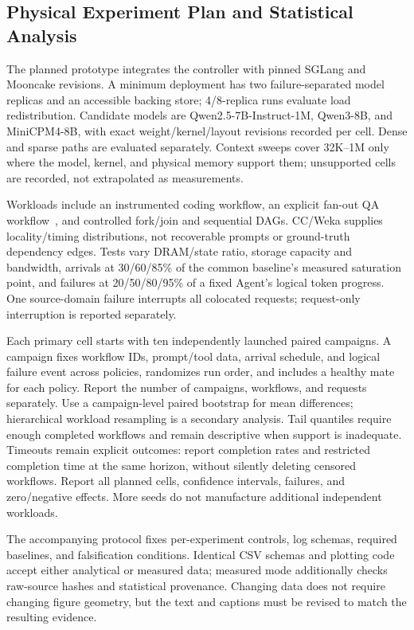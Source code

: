 \documentclass[sigplan,10pt,anonymous,nonacm]{acmart}
\begin{document}
\subsection{Physical Experiment Plan and Statistical Analysis}
\label{sec:eval-plan}

The planned prototype integrates the controller with pinned SGLang and
Mooncake revisions. A minimum deployment has two failure-separated model
replicas and an accessible backing store; 4/8-replica runs evaluate load
redistribution. Candidate models are Qwen2.5-7B-Instruct-1M, Qwen3-8B, and
MiniCPM4-8B, with exact weight/kernel/layout revisions recorded per cell.
Dense and sparse paths are evaluated separately. Context sweeps cover
32K--1M only where the model, kernel, and physical memory support them;
unsupported cells are recorded, not extrapolated as measurements.

Workloads include an instrumented coding workflow, an explicit fan-out QA
workflow~\cite{zhu2024fanoutqa}, and controlled fork/join and sequential
DAGs. CC/Weka supplies locality/timing distributions, not recoverable
prompts or ground-truth dependency edges. Tests vary DRAM/state ratio,
storage capacity and bandwidth, arrivals at 30/60/85\% of the common
baseline's measured saturation point, and failures at 20/50/80/95\% of a
fixed Agent's logical token progress. One source-domain failure interrupts
all colocated requests; request-only interruption is reported separately.

Each primary cell starts with ten independently launched paired campaigns.
A campaign fixes workflow IDs, prompt/tool data, arrival schedule, and
logical failure event across policies, randomizes run order, and includes
a healthy mate for each policy. Report the number of campaigns, workflows,
and requests separately. Use a campaign-level paired bootstrap for mean
differences; hierarchical workload resampling is a secondary analysis.
Tail quantiles require enough completed workflows and remain descriptive
when support is inadequate. Timeouts remain explicit outcomes: report
completion rates and restricted completion time at the same horizon,
without silently deleting censored workflows. Report all planned cells,
confidence intervals, failures, and zero/negative effects. More seeds do
not manufacture additional independent workloads.

The accompanying protocol fixes per-experiment controls, log schemas,
required baselines, and falsification conditions. Identical CSV schemas
and plotting code accept either analytical or measured data; measured
mode additionally checks raw-source hashes and statistical provenance.
Changing data does not require changing figure geometry, but the text and
captions must be revised to match the resulting evidence.
\end{document}
